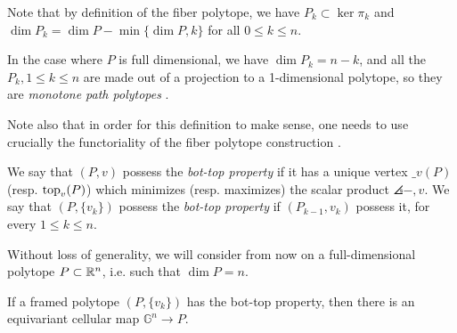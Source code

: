 Note that by definition of the fiber polytope, we have $P_k \subset \ker \pi_k$ and $\dim P_k = \dim P - \min\{ \dim P,k\}$ for all $0\leq k \leq n$.

In the case where $P$ is full dimensional, we have $\dim P_k = n-k$, and all the $P_k, 1 \leq k \leq n$ are made out of a projection to a 1-dimensional polytope, so they are \emph{monotone path polytopes} \cite[Theorem 5.3]{BilleraSturmfels92}.



Note also that in order for this definition to make sense, one needs to use crucially the functoriality of the fiber polytope construction \cite[Lemma 2.3]{BilleraSturmfels92}.

\begin{definition}
	We say that $(P,v)$ possess the \emph{bot-top property} if it has a unique vertex $\bm_v(P)$ (resp. $\operatorname{top}_v(P)$) which minimizes (resp. maximizes) the scalar product $\angles{-,v}$.
	We say that $(P,\{v_k\})$ possess the \emph{bot-top property} if $(P_{k-1}, v_k)$ possess it, for every $1\leq k \leq n$.
\end{definition}

Without loss of generality, we will consider from now on a full-dimensional polytope $P\subset \mathbb{R}^n$, i.e. such that $\dim P = n$.

\begin{theorem}
	If a framed polytope $(P,\{v_k\})$ has the bot-top property, then there is an equivariant cellular map $\mathbb{G}^n \to P$.
\end{theorem}

